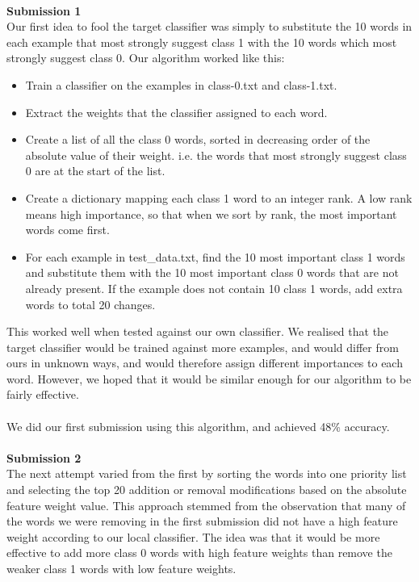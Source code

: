 \documentclass{article}
\begin{document}
\\
\textbf{\large Submission 1} \\
Our first idea to fool the target classifier was simply to substitute the 10 words in each example that most strongly suggest class 1 with the 10 words which most strongly suggest class 0. Our algorithm worked like this:
\begin{itemize}
  \item{Train a classifier on the examples in class-0.txt and class-1.txt.}
  \item{Extract the weights that the classifier assigned to each word.}
  \item{Create a list of all the class 0 words, sorted in decreasing order of the absolute value of their weight. i.e. the words that most strongly suggest class 0 are at the start of the list.}
  \item{Create a dictionary mapping each class 1 word to an integer rank. A low rank means high importance, so that when we sort by rank, the most important words come first.}
  \item{For each example in test\_data.txt, find the 10 most important class 1 words and substitute them with the 10 most important class 0 words that are not already present. If the example does not contain 10 class 1 words, add extra words to total 20 changes.}
\end{itemize}
This worked well when tested against our own classifier. We realised that the target classifier would be trained against more examples, and would differ from ours in unknown ways, and would therefore assign different importances to each word. However, we hoped that it would be similar enough for our algorithm to be fairly effective.\\
\\
We did our first submission using this algorithm, and achieved 48\% accuracy. \\
\\
\textbf{\large Submission 2} \\
The next attempt varied from the first by sorting the words into one priority list and selecting the top 20 addition or removal modifications based on the absolute feature weight value. This approach stemmed from the observation that many of the words we were removing in the first submission did not have a high feature weight according to our local classifier. The idea was that it would be more effective to add more class 0 words with high feature weights than remove the weaker class 1 words with low feature weights.
\end{document}
